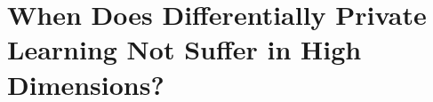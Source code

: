 \chapter[When Does Differentially Private Learning Not Suffer in \\High Dimensions?]{\LARGE When Does Differentially Private Learning Not Suffer in High Dimensions?}\label{ch_5}

% 






